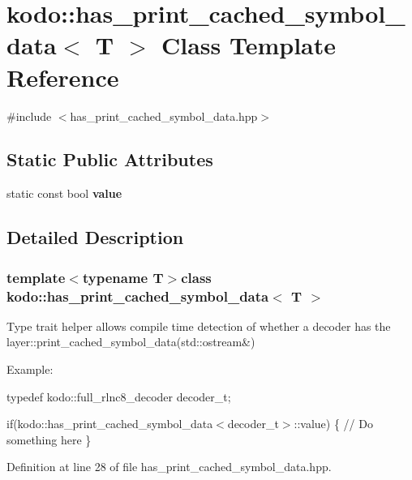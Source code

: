 \hypertarget{classkodo_1_1has__print__cached__symbol__data}{\section{kodo\-:\-:has\-\_\-print\-\_\-cached\-\_\-symbol\-\_\-data$<$ T $>$ Class Template Reference}
\label{classkodo_1_1has__print__cached__symbol__data}
}


{\ttfamily \#include $<$has\-\_\-print\-\_\-cached\-\_\-symbol\-\_\-data.\-hpp$>$}

\subsection*{Static Public Attributes}
\begin{DoxyCompactItemize}
\item 
static const bool {\bfseries value}
\end{DoxyCompactItemize}


\subsection{Detailed Description}
\subsubsection*{template$<$typename T$>$class kodo\-::has\-\_\-print\-\_\-cached\-\_\-symbol\-\_\-data$<$ T $>$}

Type trait helper allows compile time detection of whether a decoder has the layer\-::print\-\_\-cached\-\_\-symbol\-\_\-data(std\-::ostream\&)

Example\-:

typedef kodo\-::full\-\_\-rlnc8\-\_\-decoder decoder\-\_\-t;

if(kodo\-::has\-\_\-print\-\_\-cached\-\_\-symbol\-\_\-data$<$decoder\-\_\-t$>$\-::value) \{ // Do something here \} 

Definition at line 28 of file has\-\_\-print\-\_\-cached\-\_\-symbol\-\_\-data.\-hpp.



